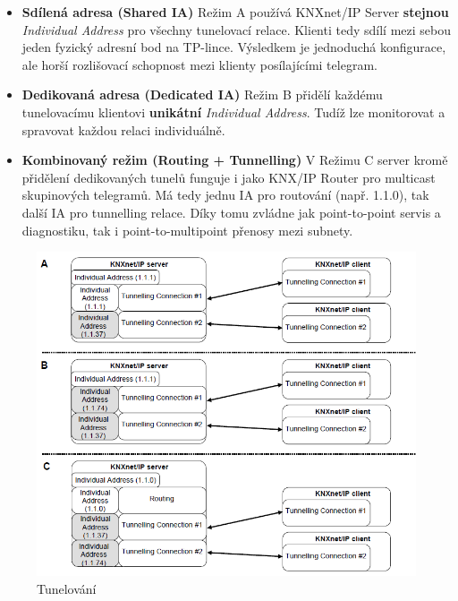 \begin{itemize}
  \item \textbf{Sdílená adresa (Shared IA)}  
    \newline Režim A používá KNXnet/IP Server \textbf{stejnou} \textit{Individual Address} pro všechny tunelovací relace. Klienti tedy sdílí mezi sebou jeden fyzický adresní bod na TP-lince. Výsledkem je jednoduchá konfigurace, ale horší rozlišovací schopnost mezi klienty posílajícími telegram.
  \item \textbf{Dedikovaná adresa (Dedicated IA)}  
    \newline Režim B přidělí každému tunelovacímu klientovi \textbf{unikátní} \textit{Individual Address}. Tudíž lze monitorovat a spravovat každou relaci individuálně.

  \item \textbf{Kombinovaný režim (Routing + Tunnelling)}  
    \newline V Režimu C server kromě přidělení dedikovaných tunelů funguje i jako KNX/IP Router pro multicast skupinových telegramů. Má tedy jednu IA pro routování (např. 1.1.0), tak další IA pro tunnelling relace. Díky tomu zvládne jak point-to-point servis a diagnostiku, tak i point-to-multipoint přenosy mezi subnety. \newline
\end{itemize}
\begin{figure}[!h]
  \begin{center}
    \includegraphics[scale=0.7]{obrazky/KNX_Tunelling.png}
  \end{center}
  \caption[Tunelování \cite{KNXTunnel}]{Tunelování \cite{KNXTunnel}}
  \label{fig:Tunelovani}
\end{figure}
